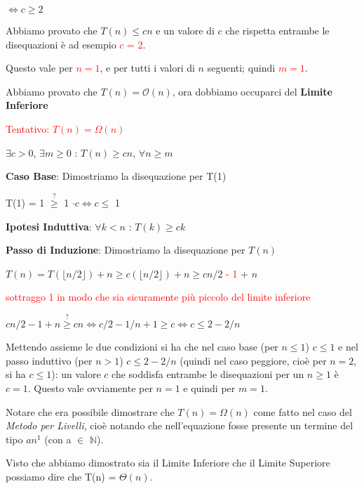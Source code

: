 \documentclass[../cheatSheetAlgoritmi.tex]{subfiles}
\begin{document}
$\iff c \geq 2$

Abbiamo provato che $T(n) \leq cn$ e un valore di $c$ che rispetta entrambe le disequazioni è ad esempio \textcolor{red}{$c$ = 2}.

Questo vale per \textcolor{red}{$n = 1$}, e per tutti i valori di $n$ seguenti; quindi \textcolor{red}{$m = 1$}.

Abbiamo provato che $T(n) = \mathcal{O}(n)$, ora dobbiamo occuparci del \textbf{Limite Inferiore}

\bigskip

\textcolor{red}{Tentativo: $T(n) = \Omega(n)$}

$\exists c > 0$, $\exists m \geq 0$ : $T(n) \geq cn$, $\forall n \geq m$

\bigskip

\textbf{Caso Base}: Dimostriamo la disequazione per T(1)

T(1) = 1 $\stackrel{?}{\geq}$ 1 $\cdot c \iff c \leq$ 1

\bigskip

\textbf{Ipotesi Induttiva}: $\forall k < n$ : $T(k) \geq ck$

\textbf{Passo di Induzione}: Dimostriamo la disequazione per $T(n)$

$T(n) =  T(\lfloor n/2 \rfloor) + n \geq c( \lfloor n/2 \rfloor) + n \geq cn/2$ \textcolor{red}{- 1} + $n$

\bigskip

\textcolor{red}{sottraggo 1 in modo che sia sicuramente più piccolo del limite inferiore} 

\bigskip

$cn/2 - 1 + n \stackrel{?}{\geq} cn \iff c/2 - 1/n + 1 \geq c \iff c \leq 2 - 2/n$
\newpage
\begin{flushleft}
Mettendo assieme le due condizioni si ha che nel caso base (per $n \leq 1$) $c \leq 1$ e nel passo induttivo (per $n > 1$) $c \leq 2 - 2/n$ (quindi nel caso peggiore, cioè per $n = 2$, si ha $c \leq 1$): un valore $c$ che soddisfa entrambe le disequazioni per un $n \geq 1$ è $c = 1$. Questo vale ovviamente per $n = 1$ e quindi per $m = 1$.
\end{flushleft}
Notare che era possibile dimostrare che $T(n) = \Omega(n)$ come fatto nel caso del \emph{Metodo per Livelli}, cioè notando che nell'equazione fosse presente un termine del tipo  $an^{1}$ (con a $\in$ $\mathbb{N}$).

Visto che abbiamo dimostrato sia il Limite Inferiore che il Limite Superiore possiamo dire che T(n) = $\Theta(n)$.
\end{document}
